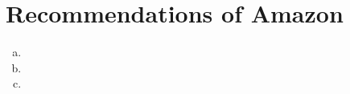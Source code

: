 
\section{Recommendations of Amazon}

\begin{enumerate}[a.]

\item 

\item

\item

\end{enumerate}

